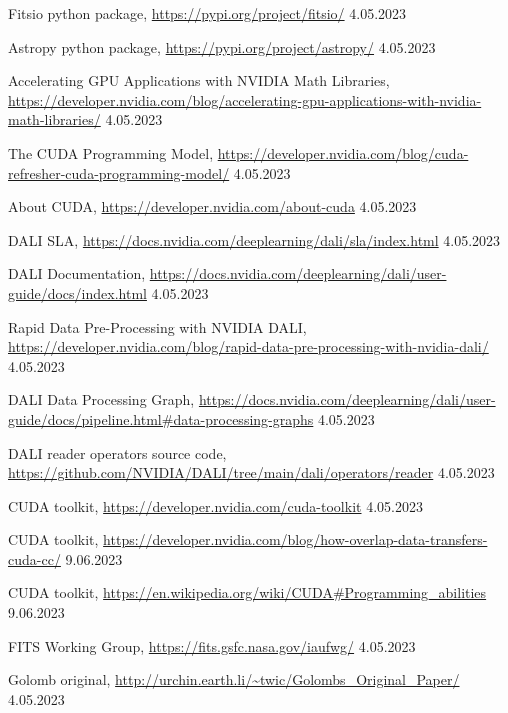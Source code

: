 \documentclass[licencjacka,en]{pracamgr}
\begin{document}
\begin{thebibliography}{99}
         {Fitsio python package},
        \url{https://pypi.org/project/fitsio/} 4.05.2023

         {Astropy python package},
        \url{https://pypi.org/project/astropy/} 4.05.2023

         {Accelerating GPU Applications with NVIDIA Math Libraries},
        \url{https://developer.nvidia.com/blog/accelerating-gpu-applications-with-nvidia-math-libraries/} 4.05.2023

         {The CUDA Programming Model},
        \url{https://developer.nvidia.com/blog/cuda-refresher-cuda-programming-model/} 4.05.2023

         {About CUDA},
        \url{https://developer.nvidia.com/about-cuda} 4.05.2023

         {DALI SLA},
        \url{https://docs.nvidia.com/deeplearning/dali/sla/index.html} 4.05.2023

         {DALI Documentation},
        \url{https://docs.nvidia.com/deeplearning/dali/user-guide/docs/index.html} 4.05.2023

         {Rapid Data Pre-Processing with NVIDIA DALI},
        \url{https://developer.nvidia.com/blog/rapid-data-pre-processing-with-nvidia-dali/} 4.05.2023

         {DALI Data Processing Graph},
        \url{https://docs.nvidia.com/deeplearning/dali/user-guide/docs/pipeline.html#data-processing-graphs} 4.05.2023 

         {DALI reader operators source code},
        \url{https://github.com/NVIDIA/DALI/tree/main/dali/operators/reader} 4.05.2023

         {CUDA toolkit},
        \url{https://developer.nvidia.com/cuda-toolkit} 4.05.2023

         {CUDA toolkit},
        \url{https://developer.nvidia.com/blog/how-overlap-data-transfers-cuda-cc/} 9.06.2023

         {CUDA toolkit},
        \url{https://en.wikipedia.org/wiki/CUDA#Programming_abilities} 9.06.2023
        

         {FITS Working Group},
        \url{https://fits.gsfc.nasa.gov/iaufwg/} 4.05.2023

         {Golomb original},
        \url{http://urchin.earth.li/~twic/Golombs_Original_Paper/} 4.05.2023


\end{thebibliography}
\end{document}
